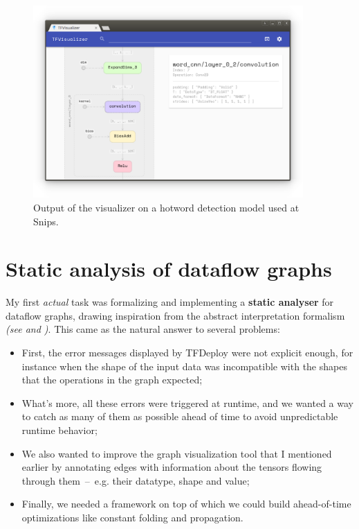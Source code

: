 \documentclass[11pt]{article}
\begin{document}
\bigskip
\begin{figure}[!h]
\centering
    \caption{Output of the visualizer on a hotword detection model used at Snips.}
    \label{fig-tfdeploy-visualizer}
    \vspace{-1.4em}
    \includegraphics[width=0.92\textwidth]{tfdeploy-visualizer.png}
    \vspace{-4em}
\end{figure}

\restoregeometry
\newpage
\section{Static analysis of dataflow graphs}
\label{sec-static}

My first \textit{actual} task was formalizing and implementing a \textbf{static analyser} for dataflow graphs, drawing inspiration from the abstract interpretation formalism \textit{(see \cite{roux-book} and \cite{schwartzbach-notes})}. This came as the natural answer to several problems:

\begin{itemize}
    \item First, the error messages displayed by TFDeploy were not explicit enough, for instance when the shape of the input data was incompatible with the shapes that the operations in the graph expected;
    \item What's more, all these errors were triggered at runtime, and we wanted a way to catch as many of them as possible ahead of time to avoid unpredictable runtime behavior;
    \item We also wanted to improve the graph visualization tool \cite{visualizer} that I mentioned earlier by annotating edges with information about the tensors flowing through them~--~e.g. their datatype, shape and value;
    \item Finally, we needed a framework on top of which we could build ahead-of-time optimizations like constant folding and propagation.
\end{itemize}
\end{document}
